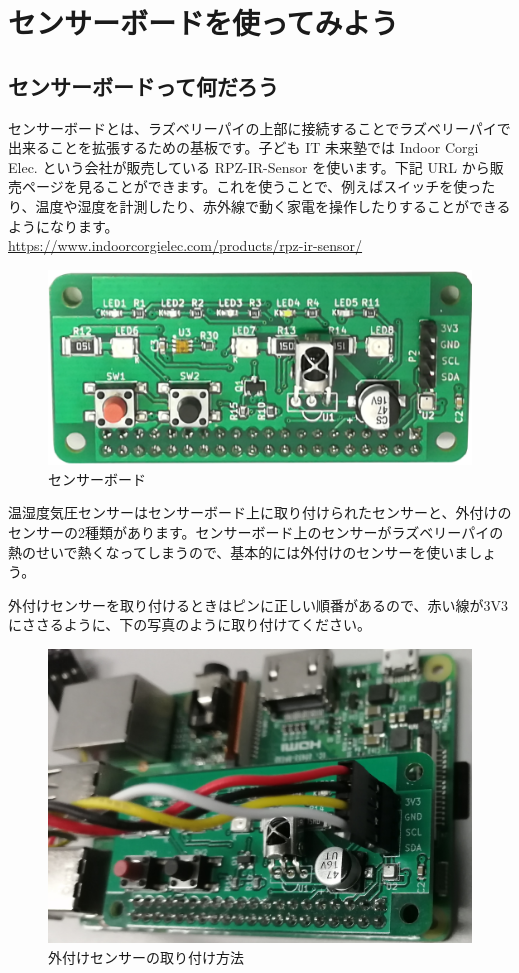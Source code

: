 \section{センサーボードを使ってみよう}
\subsection{センサーボードって何だろう}

センサーボードとは、ラズベリーパイの上部に接続することでラズベリーパイで出来ることを拡張するための基板です。子ども IT 未来塾では Indoor Corgi Elec. という会社が販売している RPZ-IR-Sensor を使います。下記 URL から販売ページを見ることができます。これを使うことで、例えばスイッチを使ったり、温度や湿度を計測したり、赤外線で動く家電を操作したりすることができるようになります。\\
\url{https://www.indoorcorgielec.com/products/rpz-ir-sensor/}\\

\begin{figure}[H]
    \centering
    \includegraphics[width=0.6\linewidth]{images/chap03/text03-img030.png}
    \caption{センサーボード}
\end{figure}

温湿度気圧センサーはセンサーボード上に取り付けられたセンサーと、外付けのセンサーの2種類があります。センサーボード上のセンサーがラズベリーパイの熱のせいで熱くなってしまうので、基本的には外付けのセンサーを使いましょう。

外付けセンサーを取り付けるときはピンに正しい順番があるので、赤い線が3V3にささるように、下の写真のように取り付けてください。

\begin{figure}[H]
    \centering
    \includegraphics[width=0.6\linewidth]{images/chap03/text03-img034.jpg}
    \caption{外付けセンサーの取り付け方法}
\end{figure}

